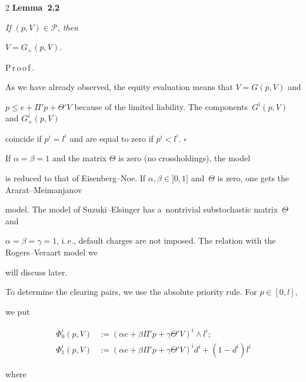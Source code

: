\begin{multicols}{2}
\textbf{Lemma~2.2}\ %

\textit{If $(p,V)\in\mathcal{P}$, then}

$V = G_+(p, V)$.



\smallskip



\noindent

P\,r\,o\,o\,f\,.\ \

As we have already observed, the equity evaluation means that   $V = G(p, V)$  and     

$p \le e + \Pi' p + \Theta' V$ because of the limited liability. The components~$G^i(p, V)$ and  $G^i_+(p, V)$

coincide if $p^i=l^i$ and are equal to zero if $p^i<l^i$. \hfill$\square$







\smallskip





If $\alpha=\beta=1$ and the  matrix $\Theta$ is zero (no crossholdings), the model 

is reduced to that of  Eisenberg--Noe.  If $\alpha,\beta\in ]0,1]$ and~$\Theta$ is zero,  one gets the Ararat--Meimanjanov 

model. The model of Suzuki--Elsinger has a~nontrivial substochastic matrix~$\Theta$ and  

$\alpha=\beta=\gamma=1$, i.\,e.,  default charges are not imposed. The relation with the Rogers--Veraart model we 

will discuss later. 






To determine the clearing pairs, we  use the absolute priority rule. For $p\in [0,l]$,

we put   

\begin{align*}

\Phi^i_0(p, V) & :=  \left(\alpha e+\beta \Pi' p + \gamma \Theta' V\right)^i \wedge l^i;\\

\Phi^i_1(p, V) & :=  \left(\alpha e+\beta \Pi' p + \gamma \Theta' V\right)^i d^i+ \left(1 - d^i\right)l^i

\end{align*}

where 


\end{multicols}
